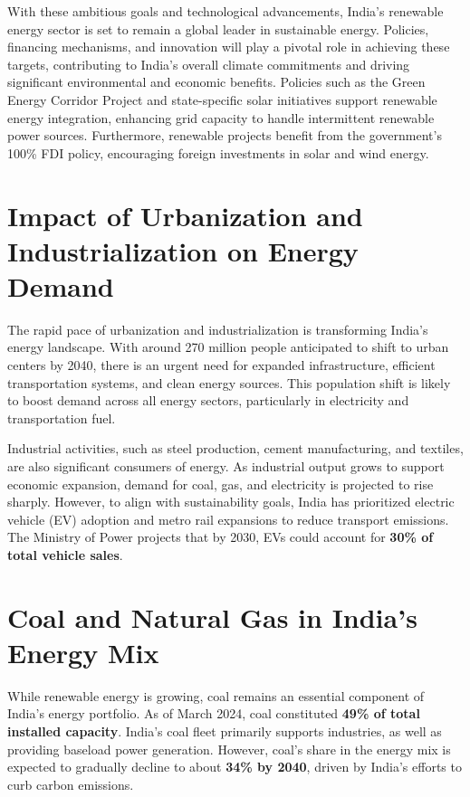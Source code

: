 \documentclass[12pt]{article}
\begin{document}
\begin{spacing}{1.5}
With these ambitious goals and technological advancements, India’s renewable energy sector is set to remain a global leader in sustainable energy. Policies, financing mechanisms, and innovation will play a pivotal role in achieving these targets, contributing to India’s overall climate commitments and driving significant environmental and economic benefits.
Policies such as the Green Energy Corridor Project and state-specific solar initiatives support renewable energy integration, enhancing grid capacity to handle intermittent renewable power sources. Furthermore, renewable projects benefit from the government’s 100\% FDI policy, encouraging foreign investments in solar and wind energy.

\section*{Impact of Urbanization and Industrialization on Energy Demand}
The rapid pace of urbanization and industrialization is transforming India’s energy landscape. With around 270 million people anticipated to shift to urban centers by 2040, there is an urgent need for expanded infrastructure, efficient transportation systems, and clean energy sources. This population shift is likely to boost demand across all energy sectors, particularly in electricity and transportation fuel.

Industrial activities, such as steel production, cement manufacturing, and textiles, are also significant consumers of energy. As industrial output grows to support economic expansion, demand for coal, gas, and electricity is projected to rise sharply. However, to align with sustainability goals, India has prioritized electric vehicle (EV) adoption and metro rail expansions to reduce transport emissions. The Ministry of Power projects that by 2030, EVs could account for \textbf{30\% of total vehicle sales}.

\section*{Coal and Natural Gas in India’s Energy Mix}
While renewable energy is growing, coal remains an essential component of India’s energy portfolio. As of March 2024, coal constituted \textbf{49\% of total installed capacity}. India’s coal fleet primarily supports industries, as well as providing baseload power generation. However, coal’s share in the energy mix is expected to gradually decline to about \textbf{34\% by 2040}, driven by India's efforts to curb carbon emissions.


\end{spacing}
\end{document}
